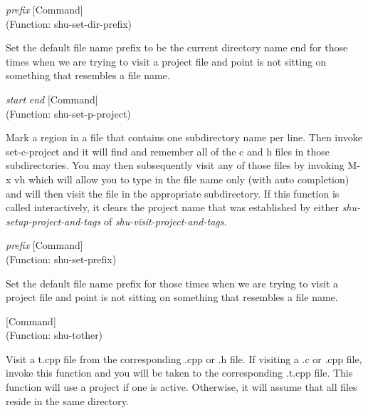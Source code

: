 \vspace{1em}
\noindent
{}
\usebox{\funcname}\emph{prefix}
 \hfill [Command]\\%
 (Function: shu-set-dir-prefix)

\begin{doc-string}
Set the default file name prefix to be the current directory name end for those
times when we are trying to visit a project file and point is not sitting on
something that resembles a file name.
\end{doc-string}

\vspace{1em}
\noindent
{}
\usebox{\funcname}\emph{start} \emph{end}
 \hfill [Command]\\%
 (Function: shu-set-p-project)

\begin{doc-string}
Mark a region in a file that contains one subdirectory name per line.  Then
invoke set-c-project and it will find and remember all of the c and h files in
those subdirectories.  You may then subsequently visit any of those files by
invoking M-x vh which will allow you to type in the file name only (with auto
completion) and will then visit the file in the appropriate subdirectory.  If
this function is called interactively, it clears the project name that was
established by either \emph{shu-setup-project-and-tags} of \emph{shu-visit-project-and-tags}.
\end{doc-string}

\vspace{1em}
\noindent
{}
\usebox{\funcname}\emph{prefix}
 \hfill [Command]\\%
 (Function: shu-set-prefix)

\begin{doc-string}
Set the default file name prefix for those times when we are trying to visit
a project file and point is not sitting on something that resembles a file name.
\end{doc-string}

\vspace{1em}
\noindent
{}
\usebox{\funcname}
 \hfill [Command]\\%
 (Function: shu-tother)

\begin{doc-string}
Visit a t.cpp file from the corresponding .cpp or .h file.  If visiting a .c
or .cpp file, invoke this function and you will be taken to the corresponding
.t.cpp file.  This function will use a project if one is active.  Otherwise, it
will assume that all files reside in the same directory.
\end{doc-string}


